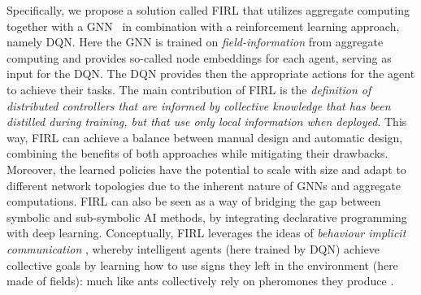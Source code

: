 Specifically, we propose a solution called \ac{FIRL} that utilizes aggregate computing together with a \ac{GNN}~\cite{DBLP:journals/aiopen/ZhouCHZYLWLS20} in combination with a reinforcement learning approach, namely \ac{DQN}. 
 Here the \ac{GNN} is trained on \emph{field-information} from aggregate computing and provides so-called node embeddings for each agent, serving as input for the \ac{DQN}. 
 The \ac{DQN} provides then the appropriate actions for the agent to achieve their tasks.
%
The main contribution of \ac{FIRL} is the \emph{definition of distributed controllers that are informed by collective knowledge that has been distilled during training, but that use only local information when deployed}. 
This way, \ac{FIRL} can achieve a balance between manual design and automatic design, combining the benefits of both approaches while mitigating their drawbacks.
Moreover, the learned policies have the potential to scale with size and adapt to different network topologies due to the inherent nature of GNNs and aggregate computations.
\ac{FIRL} can also be seen as a way of bridging the gap between symbolic and sub-symbolic AI methods, by integrating declarative programming with deep learning.
%
Conceptually, \ac{FIRL} leverages the ideas of \emph{behaviour implicit communication} \cite{DBLP:journals/ijaci/CastelfranchiPT10} \cite{DBLP:conf/e4mas/TummoliniCRVO04}, whereby intelligent agents (here trained by DQN) achieve collective goals by learning how to use signs they left in the environment (here made of fields): much like ants collectively rely on pheromones they produce \cite{DBLP:journals/anor/Parunak97}.

